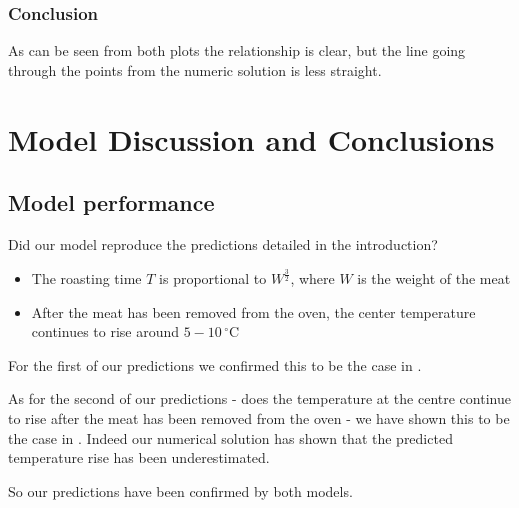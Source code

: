 \documentclass{report}
\begin{document}
\subsection{Conclusion}

As can be seen from both plots the relationship is clear, but the line going through the points from the numeric solution is 
less straight.



















\chapter{Model Discussion and Conclusions}




\section{Model performance}

Did our model reproduce the predictions detailed in the introduction?\bigskip

\begin{itemize}

\item The roasting time $T$ is proportional to $W^{\frac{3}{2}}$, where $W$ is 
      the weight of the meat
\item After the meat has been removed from the oven, the center temperature 
      continues to rise around $5 - 10\,^{\circ}\mathrm{C}$

\end{itemize}\medskip

For the first of our predictions we confirmed this to be the case in .\bigskip

As for the second of our predictions - does the temperature at the centre continue to rise after the meat has been removed 
from the oven - we have shown this to be the case in . Indeed our numerical solution has 
shown that the predicted temperature rise has been underestimated.\bigskip

So our predictions have been confirmed by both models.
\end{document}
